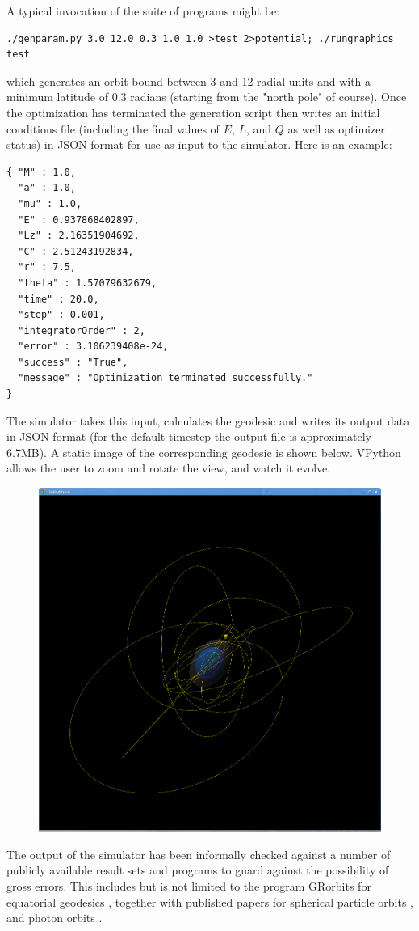 \documentclass[11pt]{article}
\begin{document}
A typical invocation of the suite of programs might be:
\begin{verbatim}
./genparam.py 3.0 12.0 0.3 1.0 1.0 >test 2>potential; ./rungraphics test
\end{verbatim}
which generates an orbit bound between 3 and 12 radial units and with a minimum latitude of 0.3 radians (starting from the "north pole" of course).
Once the optimization has terminated the generation script then writes an initial conditions file (including the final values of $E$, $L$, and $Q$ as well as optimizer status) in JSON format for use as input to the simulator.  Here is an example:
\begin{verbatim}
{ "M" : 1.0,
  "a" : 1.0,
  "mu" : 1.0,
  "E" : 0.937868402897,
  "Lz" : 2.16351904692,
  "C" : 2.51243192834,
  "r" : 7.5,
  "theta" : 1.57079632679,
  "time" : 20.0,
  "step" : 0.001,
  "integratorOrder" : 2,
  "error" : 3.106239408e-24,
  "success" : "True",
  "message" : "Optimization terminated successfully."
}
\end{verbatim}
The simulator takes this input, calculates the geodesic and writes its output data in JSON format (for the default timestep the output file is approximately 6.7MB).  A static image of the corresponding geodesic is shown below.  VPython allows the user to zoom and rotate the view, and watch it evolve.
\begin{figure}[h]
\includegraphics[width=\textwidth]{Screenshot}
\end{figure}
The output of the simulator has been informally checked against a number of publicly available result sets and programs to guard against the possibility of gross errors.  This includes  but is not limited to the program GRorbits for equatorial geodesics \cite{grorbits}, together with published papers for spherical particle orbits \cite{teo}, and photon orbits \cite{kheng}.
\end{document}
